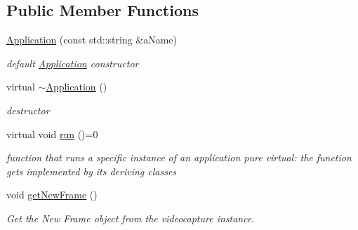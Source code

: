 \subsection*{Public Member Functions}
\begin{DoxyCompactItemize}
\item 
\hyperlink{classApplication_a848569c0a80400dba542e8d0cf3726fe}{Application} (const std\+::string \&a\+Name)\hypertarget{classApplication_a848569c0a80400dba542e8d0cf3726fe}{}\label{classApplication_a848569c0a80400dba542e8d0cf3726fe}

\begin{DoxyCompactList}\small\item\em default \hyperlink{classApplication}{Application} constructor \end{DoxyCompactList}\item 
virtual \hyperlink{classApplication_a748bca84fefb9c12661cfaa2f623748d}{$\sim$\+Application} ()\hypertarget{classApplication_a748bca84fefb9c12661cfaa2f623748d}{}\label{classApplication_a748bca84fefb9c12661cfaa2f623748d}

\begin{DoxyCompactList}\small\item\em destructor \end{DoxyCompactList}\item 
virtual void \hyperlink{classApplication_a7dd8e91a715194dd391be7ae3ecdd985}{run} ()=0\hypertarget{classApplication_a7dd8e91a715194dd391be7ae3ecdd985}{}\label{classApplication_a7dd8e91a715194dd391be7ae3ecdd985}

\begin{DoxyCompactList}\small\item\em function that runs a specific instance of an application pure virtual\+: the function gets implemented by its deriving classes \end{DoxyCompactList}\item 
void \hyperlink{classApplication_a05a0e0204f9d319991c0cc5fdc351790}{get\+New\+Frame} ()\hypertarget{classApplication_a05a0e0204f9d319991c0cc5fdc351790}{}\label{classApplication_a05a0e0204f9d319991c0cc5fdc351790}

\begin{DoxyCompactList}\small\item\em Get the New Frame object from the videocapture instance. \end{DoxyCompactList}\end{DoxyCompactItemize}
